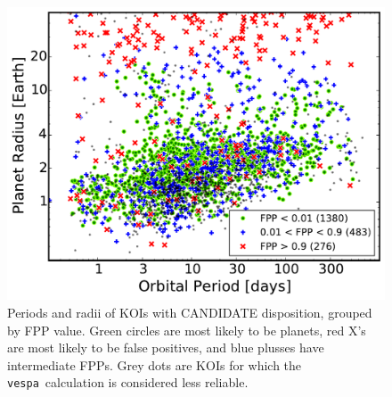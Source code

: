 \documentclass{emulateapj}
\newcommand{\figlabel}[1]{\label{fig:#1}}
\newcommand{\vespa}{\texttt{vespa}}
\begin{document}
\begin{figure}[p]
\begin{center}
\includegraphics[width=7in]{figures/RP_cand.pdf}
\end{center}
\caption{Periods and radii of KOIs with CANDIDATE disposition, grouped
  by FPP value.  Green circles are most likely to be planets, red X's
  are most likely to be false positives, and blue plusses have
  intermediate FPPs.  Grey dots are KOIs for which the
  \vespa\ calculation is considered less reliable.  
  \figlabel{rpcand}}
\end{figure}





\begin{turnpage}

\end{turnpage}
\end{document}
